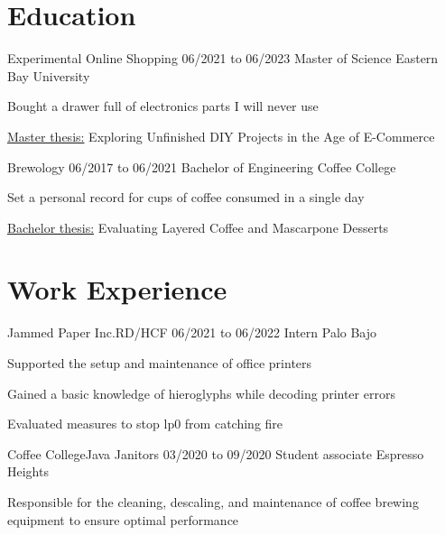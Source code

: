 %
%
%
%

\section{Education}
\begin{resumeList}  {Experimental Online Shopping}{}    {06/2021 to 06/2023}
                    {Master of Science}                 {Eastern Bay University}
    \item Bought a drawer full of electronics parts I will never use
    \item \underline{Master thesis:} Exploring Unfinished DIY Projects in the Age of E-Commerce
\end{resumeList}
\begin{resumeList}  {Brewology}{}                {06/2017 to 06/2021}
                    {Bachelor of Engineering}    {Coffee College}
    \item Set a personal record for cups of coffee consumed in a single day
    \item \underline{Bachelor thesis:} Evaluating Layered Coffee and Mascarpone Desserts
\end{resumeList}


\section{Work Experience}
\begin{resumeList}  {Jammed Paper Inc.}{RD/HCF}    {06/2021 to 06/2022}
                    {Intern}                       {Palo Bajo}
    \item Supported the setup and maintenance of office printers
    \item Gained a basic knowledge of hieroglyphs while decoding printer errors
    \item Evaluated measures to stop lp0 from catching fire
\end{resumeList}
\begin{resumeList}  {Coffee College}{Java Janitors}    {03/2020 to 09/2020}
                    {Student associate}                {Espresso Heights}
    \item Responsible for the cleaning, descaling, and maintenance of coffee brewing equipment to ensure optimal performance
\end{resumeList}


